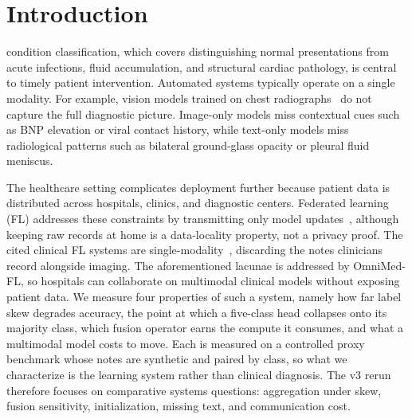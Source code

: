 \documentclass[letterpaper, conference]{IEEEtran}
\begin{document}
\section{Introduction}

 condition classification, which covers distinguishing
normal presentations from acute infections, fluid accumulation, and structural
cardiac pathology, is central to timely patient intervention. Automated systems
typically operate on a single modality. For example, vision models trained on chest
radiographs~\cite{Irvin2019} do not capture the full diagnostic picture. Image-only models miss
contextual cues such as BNP elevation or viral contact history, while text-only
models miss radiological patterns such as bilateral ground-glass opacity or pleural
fluid meniscus.

The healthcare setting complicates deployment further because patient data is
distributed across hospitals, clinics, and diagnostic centers.
Federated learning (FL) addresses these constraints by
transmitting only model updates~\cite{McMahan2017}, although keeping raw records at
home is a data-locality property, not a privacy proof. The cited clinical FL
systems are single-modality~\cite{Sheller2020,Dou2021},
discarding the notes clinicians record alongside imaging. The aforementioned lacunae is addressed by OmniMed-FL, so hospitals can collaborate on multimodal clinical models without
exposing patient data. We measure four properties of such a system, namely how far
label skew degrades accuracy, the point at which a five-class head collapses onto its
majority class, which fusion operator earns the compute it consumes, and what a
multimodal model costs to move. Each is measured on a controlled proxy benchmark
whose notes are synthetic and paired by class, so what we characterize is the
learning system rather than clinical diagnosis. The v3 rerun therefore focuses on
comparative systems questions: aggregation under skew, fusion sensitivity,
initialization, missing text, and communication cost.
\end{document}

